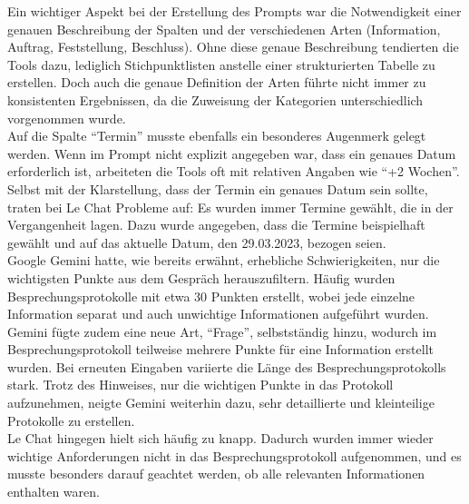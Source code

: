 Ein wichtiger Aspekt bei der Erstellung des Prompts war die Notwendigkeit einer genauen Beschreibung der Spalten und der verschiedenen 
Arten (Information, Auftrag, Feststellung, Beschluss). Ohne diese genaue Beschreibung tendierten die Tools dazu, lediglich 
Stichpunktlisten anstelle einer strukturierten Tabelle zu erstellen. Doch auch die genaue Definition der Arten führte nicht immer zu 
konsistenten Ergebnissen, da die Zuweisung der Kategorien unterschiedlich vorgenommen wurde.\\

Auf die Spalte ``Termin'' musste ebenfalls ein besonderes Augenmerk gelegt werden. Wenn im Prompt nicht explizit angegeben war, dass ein 
genaues Datum erforderlich ist, arbeiteten die Tools oft mit relativen Angaben wie ``+2 Wochen''. Selbst mit der Klarstellung, dass der 
Termin ein genaues Datum sein sollte, traten bei Le Chat Probleme auf: Es wurden immer Termine gewählt, die in der Vergangenheit lagen. 
Dazu wurde angegeben, dass die Termine beispielhaft gewählt und auf das aktuelle Datum, den 29.03.2023, bezogen seien.\\

Google Gemini hatte, wie bereits erwähnt, erhebliche Schwierigkeiten, nur die wichtigsten Punkte aus dem Gespräch herauszufiltern. 
Häufig wurden Besprechungsprotokolle mit etwa 30 Punkten erstellt, wobei jede einzelne Information separat und auch unwichtige 
Informationen aufgeführt wurden. Gemini fügte zudem eine neue Art, ``Frage'', selbstständig hinzu, wodurch im Besprechungsprotokoll 
teilweise mehrere Punkte für eine Information erstellt wurden. Bei erneuten Eingaben variierte die Länge des Besprechungsprotokolls 
stark. Trotz des Hinweises, nur die wichtigen Punkte in das Protokoll aufzunehmen, neigte Gemini weiterhin dazu, sehr detaillierte und 
kleinteilige Protokolle zu erstellen.\\

Le Chat hingegen hielt sich häufig zu knapp. Dadurch wurden immer wieder wichtige Anforderungen nicht in das Besprechungsprotokoll 
aufgenommen, und es musste besonders darauf geachtet werden, ob alle relevanten Informationen enthalten waren.

